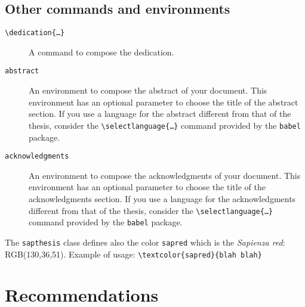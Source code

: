 \documentclass[a5paper,11pt]{article}
\newcommand{\bs}{\textbackslash}
\begin{document}
\subsection[Other commands\\ and environments]{Other commands and environments}

\begin{description}

\item[\texttt{\bs dedication\{\dots\}}] A command to compose the dedication.

\item[\texttt{abstract}] An environment to compose the abstract of your document. This environment has an optional parameter to choose the title of the abstract section.
If you use a language for the abstract different from that of the thesis, consider the \texttt{\bs selectlanguage\{\dots\}} command provided by the \texttt{babel} package.

\item[\texttt{acknowledgments}] An environment to compose the acknowledgments of your document. This environment has an optional parameter to choose the title of the acknowledgments section.
If you use a language for the acknowledgments different from that of the thesis, consider the \texttt{\bs selectlanguage\{\dots\}} command provided by the \texttt{babel} package.


\end{description}
\textcolor{sapred}{%
The \texttt{sapthesis} class defines also the color \texttt{sapred} which is the \emph{Sapienza red}: RGB(130,36,51). Example of usage: \texttt{\bs textcolor\{sapred\}\{blah blah\}}}


\section{Recommendations}
\end{document}
